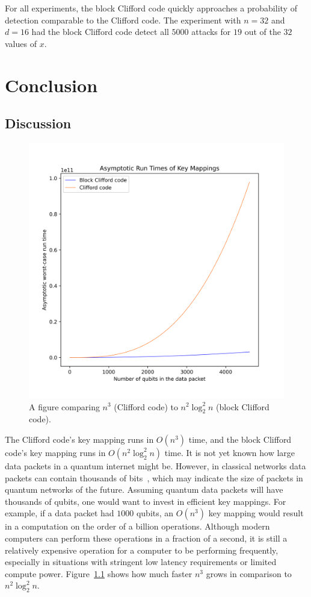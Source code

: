 For all experiments, the block Clifford code quickly approaches a probability of detection comparable to the Clifford code. The experiment with $n = 32$ and $d = 16$ had the block Clifford code detect all $5000$ attacks for $19$ out of the $32$ values of $x$.

\chapter{Conclusion}
\label{sec:Conclusion}
\section{Discussion}
\label{sec:Discussion}
\begin{figure}
    \centering
    \includegraphics[scale=0.6]{figures/keymapping_runtimes.png}
    \caption{A figure comparing $n^3$ (Clifford code) to $n^2 \log_2^2n$ (block Clifford code).}
    \label{fig:keyMappingRunTimesComparison}
\end{figure}

The Clifford code's key mapping runs in $O\left(n^3\right)$ time, and the block Clifford code's key mapping runs in $O\left(n^2 \log_2^2 n\right)$ time. It is not yet known how large data packets in a quantum internet might be. However, in classical networks data packets can contain thousands of bits~\cite{rfc879}, which may indicate the size of packets in quantum networks of the future. Assuming quantum data packets will have thousands of qubits, one would want to invest in efficient key mappings. For example, if a data packet had $1000$ qubits, an $O\left(n^3\right)$ key mapping would result in a computation on the order of a billion operations. Although modern computers can perform these operations in a fraction of a second, it is still a relatively expensive operation for a computer to be performing frequently, especially in situations with stringent low latency requirements or limited compute power. Figure~\ref{fig:keyMappingRunTimesComparison} shows how much faster $n^3$ grows in comparison to $n^2 \log_2^2n$.

